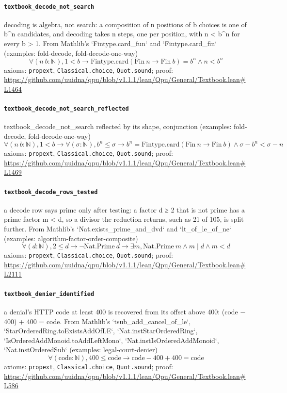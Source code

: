 \documentclass[11pt]{article}
\begin{document}
\paragraph{\texttt{textbook\_decode\_not\_search}}
decoding is algebra, not search: a composition of n positions of b choices is one of b\^{}n candidates, and decoding takes n steps, one per position, with n < b\^{}n for every b > 1. From Mathlib's `Fintype.card\_fun` and `Fintype.card\_fin` (examples: fold-decode, fold-decode-one-way)
\[ \forall (n\ b : \mathbb{N}), 1 < b \to \mathrm{Fintype.card} (\mathrm{Fin}\ n \to \mathrm{Fin}\ b) = b ^{n} \land n < b ^{n} \]
\noindent axioms: \texttt{propext}, \texttt{Classical.choice}, \texttt{Quot.sound}; proof: \url{https://github.com/uuidna/qpu/blob/v1.1.1/lean/Qpu/General/Textbook.lean\#L1464}

\paragraph{\texttt{textbook\_decode\_not\_search\_reflected}}
textbook\_decode\_not\_search reflected by its shape, conjunction (examples: fold-decode, fold-decode-one-way)
\[ \forall (n\ b : \mathbb{N}), 1 < b \to \forall (\sigma : \mathbb{N}), b ^{n} \le \sigma \to b ^{n} = \mathrm{Fintype.card} (\mathrm{Fin}\ n \to \mathrm{Fin}\ b) \land \sigma - b ^{n} < \sigma - n \]
\noindent axioms: \texttt{propext}, \texttt{Classical.choice}, \texttt{Quot.sound}; proof: \url{https://github.com/uuidna/qpu/blob/v1.1.1/lean/Qpu/General/Textbook.lean\#L1469}

\paragraph{\texttt{textbook\_decode\_rows\_tested}}
a decode row says prime only after testing: a factor d ≥ 2 that is not prime has a prime factor m < d, so a divisor the reduction returns, such as 21 of 105, is split further. From Mathlib's `Nat.exists\_prime\_and\_dvd` and `lt\_of\_le\_of\_ne` (examples: algorithm-factor-order-composite)
\[ \forall (d : \mathbb{N}), 2 \le d \to \neg \mathrm{Nat.Prime}\ d \to \exists m, \mathrm{Nat.Prime}\ m \land m \mid d \land m < d \]
\noindent axioms: \texttt{propext}, \texttt{Classical.choice}, \texttt{Quot.sound}; proof: \url{https://github.com/uuidna/qpu/blob/v1.1.1/lean/Qpu/General/Textbook.lean\#L2111}

\paragraph{\texttt{textbook\_denier\_identified}}
a denial's HTTP code at least 400 is recovered from its offset above 400: (code − 400) + 400 = code. From Mathlib's `tsub\_add\_cancel\_of\_le`, `StarOrderedRing.toExistsAddOfLE`, `Nat.instStarOrderedRing`, `IsOrderedAddMonoid.toAddLeftMono`, `Nat.instIsOrderedAddMonoid`, `Nat.instOrderedSub` (examples: legal-court-denier)
\[ \forall (\mathrm{code} : \mathbb{N}), 400 \le \mathrm{code} \to \mathrm{code} - 400 + 400 = \mathrm{code} \]
\noindent axioms: \texttt{propext}, \texttt{Classical.choice}, \texttt{Quot.sound}; proof: \url{https://github.com/uuidna/qpu/blob/v1.1.1/lean/Qpu/General/Textbook.lean\#L586}
\end{document}
